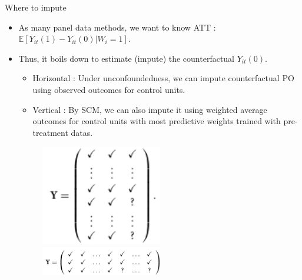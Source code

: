 \documentclass[xcolor=svgnames,aspectratio=169]{beamer}
\newcommand{\E}{\mathbb{E}}
\begin{document}
\begin{frame}{Where to impute}
    \begin{itemize}
        \item As many panel data methods, we want to know ATT : $\E[Y_{it}(1)-Y_{it}(0)|W_i=1]$.
        \item Thus, it boils down to estimate (impute) the counterfactual $Y_{it}(0)$.
        \begin{itemize}
            \item Horizontal : Under unconfoundedness, we can impute counterfactual PO using observed outcomes for control units.
            \item Vertical : By SCM, we can also impute it using weighted average outcomes for control units with most predictive weights trained with pre-treatment datas.
        \end{itemize}
        \begin{figure}
            \includegraphics[width=0.5\textwidth, height=0.4\textheight, keepaspectratio]{Horizontal.png} \ 
            \includegraphics[width=0.5\textwidth, height=0.5\textheight, keepaspectratio]{Vertical.png}
        \end{figure}
    \end{itemize}
\end{frame}
\end{document}
